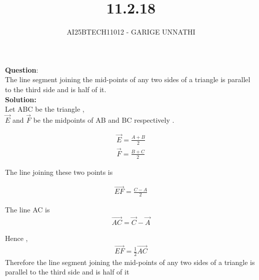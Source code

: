 \documentclass[journal]{IEEEtran}
\begin{document}



\title{11.2.18}
\author{AI25BTECH11012 - GARIGE UNNATHI}
{\let\newpage\relax\maketitle}


\renewcommand{\thefigure}{\theenumi}
\renewcommand{\thetable}{\theenumi}
\setlength{\intextsep}{10pt} %



\vspace{-1cm}

\textbf{Question}:\\
The line segment joining the mid-points of any two sides of a triangle is parallel to
the third side and is half of it.\\

\textbf{Solution: }\\

Let ABC be the triangle ,\\
$\vec{E}$ and $\vec{F}$ be the midpoints of AB and BC respectively .


\begin{align}
  \vec{E}  = \frac{A + B}{2}\\
  \vec{F}  = \frac{B + C}{2}
\end{align}

The line joining these two points is  


\begin{align}
 \vec{EF} =  \frac{C - A}{2}
\end{align}

The line AC is
\begin{align}
\vec{AC} = \vec{C} - \vec{A}
\end{align}

Hence ,
\begin{align}
    \vec{EF} = \frac{1}{2}\vec{AC}
\end{align}
Therefore the line segment joining the mid-points of any two sides of a triangle is parallel to
the third side and is half of it
\end{document}
